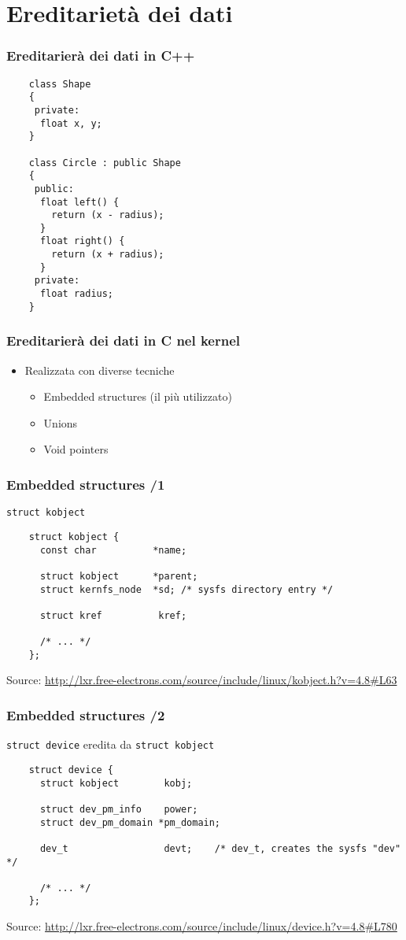 \documentclass[xetex,table]{beamer}
\begin{document}
\section{Ereditarietà dei dati}

\begin{frame}[fragile]
  \frametitle{Ereditarierà dei dati in C++}
  \begin{verbatim}
    class Shape
    {
     private:
      float x, y;
    }

    class Circle : public Shape
    {
     public:
      float left() {
        return (x - radius);
      }
      float right() {
        return (x + radius);
      }
     private:
      float radius;
    }
  \end{verbatim}
\end{frame}

\begin{frame}[fragile]
  \frametitle{Ereditarierà dei dati in C nel kernel}
  \begin{itemize}
  \item Realizzata con diverse tecniche
    \begin{itemize}
    \item Embedded structures (il più utilizzato)
    \item Unions
    \item Void pointers
    \end{itemize}
  \end{itemize}
\end{frame}

\begin{frame}[fragile]
  \frametitle{Embedded structures /1}
  \texttt{struct kobject}

  \begin{verbatim}
    struct kobject {
      const char          *name;

      struct kobject      *parent;
      struct kernfs_node  *sd; /* sysfs directory entry */

      struct kref          kref;

      /* ... */
    };
  \end{verbatim}
  {\tiny Source:
    \url{http://lxr.free-electrons.com/source/include/linux/kobject.h?v=4.8#L63}}
\end{frame}

\begin{frame}[fragile]
  \frametitle{Embedded structures /2}
  \texttt{struct device} eredita da \texttt{struct kobject}

  \begin{verbatim}
    struct device {
      struct kobject        kobj;

      struct dev_pm_info    power;
      struct dev_pm_domain *pm_domain;

      dev_t                 devt;    /* dev_t, creates the sysfs "dev" */

      /* ... */
    };
  \end{verbatim}
  {\tiny Source:
    \url{http://lxr.free-electrons.com/source/include/linux/device.h?v=4.8#L780}}
\end{frame}
\end{document}
